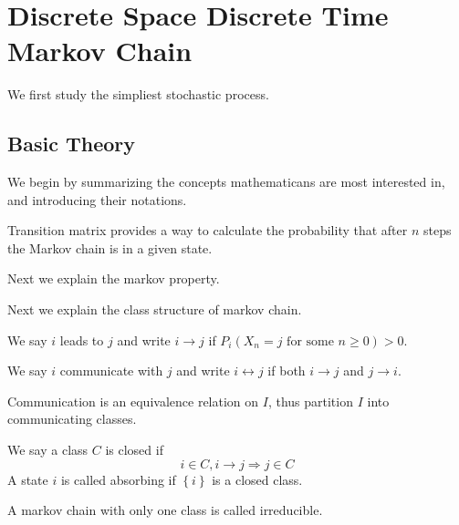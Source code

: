 \chapter{Discrete Space Discrete Time Markov Chain}
We first study the simpliest stochastic process.
\section{Basic Theory}
We begin by summarizing the concepts mathematicans are most interested in, and introducing their notations. 
\begin{definition}
    
\end{definition}

\begin{definition}
    
\end{definition}
\begin{remark}
Transition matrix provides a way to calculate the probability that after $n$ steps the Markov chain is in a given state.
\end{remark}

Next we explain the markov property.
\begin{definition}
    
\end{definition}

\begin{definition}
    
\end{definition}

Next we explain the class structure of markov chain.

\begin{definition}[lead to]
    We say $i$ leads to $j$ and write $i\to j$ if $P_i(X_n=j\text{ for some }n\geq 0)>0$.
\end{definition}
\begin{definition}
    We say $i$ communicate with $j$ and write $i\leftrightarrow j$ if both $i\to j$ and $j\to i$.
\end{definition}
\begin{theorem}
    Communication is an equivalence relation on $I$, thus partition $I$ into communicating classes.
\end{theorem}
\begin{definition}
    We say a class $C$ is closed if \[i\in C,i\to j\Longrightarrow j\in C\]
    A state $i$ is called absorbing if $\left\{i\right\}$ is a closed class.
\end{definition}
\begin{definition}[irreducibility]
    A markov chain with only one class is called irreducible.
\end{definition}


